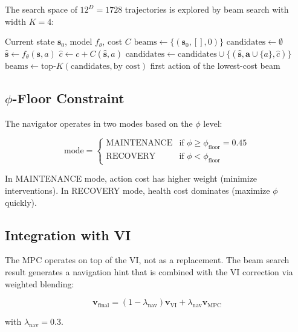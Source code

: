 The search space of $12^D = 1728$ trajectories is explored by beam
search with width $K = 4$:

\begin{algorithm}[H]
\caption{MPC Beam Search}
\label{alg:mpc_beam}
\begin{algorithmic}[1]
\REQUIRE Current state $\bm{s}_0$, model $f_\theta$, cost $C$
\STATE $\text{beams} \leftarrow \{(\bm{s}_0, [], 0)\}$ 
    \STATE $\text{candidates} \leftarrow \emptyset$
            \STATE $\hat{\bm{s}} \leftarrow f_\theta(\bm{s}, a)$
            \STATE $\hat{c} \leftarrow c + C(\hat{\bm{s}}, a)$
            \STATE $\text{candidates} \leftarrow \text{candidates} \cup \{(\hat{\bm{s}}, \bm{a} \cup \{a\}, \hat{c})\}$
        \ENDFOR
    \ENDFOR
    \STATE $\text{beams} \leftarrow \text{top-}K(\text{candidates}, \text{by cost})$
\ENDFOR
\RETURN first action of the lowest-cost beam
\end{algorithmic}
\end{algorithm}

\subsection{$\phi$-Floor Constraint}

The navigator operates in two modes based on the $\phi$ level:

\begin{equation}
    \text{mode} = \begin{cases}
        \text{MAINTENANCE} & \text{if } \phi \geq \phi_{\text{floor}} = 0.45 \\
        \text{RECOVERY} & \text{if } \phi < \phi_{\text{floor}}
    \end{cases}
\end{equation}

In MAINTENANCE mode, action cost has higher weight (minimize
interventions). In RECOVERY mode, health cost dominates (maximize
$\phi$ quickly).

\subsection{Integration with VI}

The MPC operates on top of the VI, not as a replacement. The beam
search result generates a navigation hint that is combined with the
VI correction via weighted blending:

\begin{equation}
    \bm{v}_{\text{final}} = (1 - \lambda_{\text{nav}}) \bm{v}_{\text{VI}} + \lambda_{\text{nav}} \bm{v}_{\text{MPC}}
\end{equation}

with $\lambda_{\text{nav}} = 0.3$.
